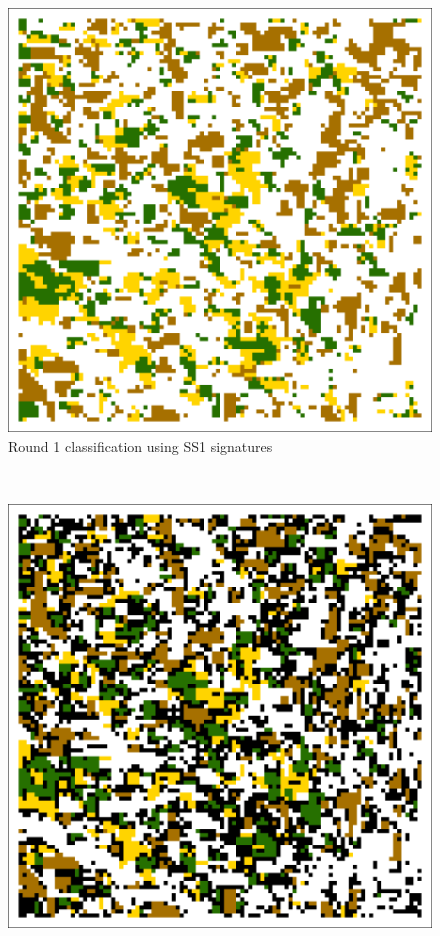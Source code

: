 \begin{ssfigure}
\begin{subfigure}[t]{.475\textwidth}
    \includegraphics[width=\textwidth]{Graphics/Testing/clip1_MODIS_round1.pdf}
    \caption{Round 1 classification using SS1 signatures}
    \label{subfig:ss1r1class}
  \end{subfigure}
  \\
  \vspace{.25in}
  \begin{subfigure}[b]{.475\textwidth}
    \includegraphics[width=\textwidth]{Graphics/Testing/clip1_MODIS_round1_correct.pdf}

\end{subfigure}
\end{ssfigure}
